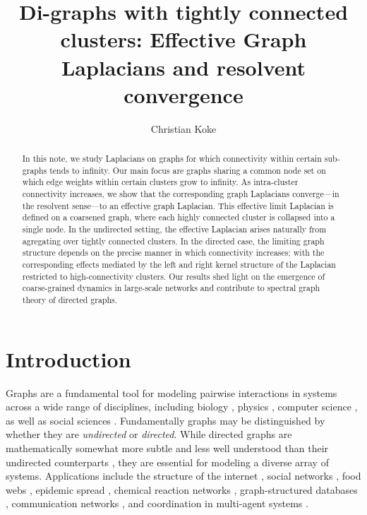 \documentclass[reqno,12pt,letterpaper]{amsart}
\title[Effective Graph Laplacians and resolvent convergence
]{Di-graphs with tightly connected clusters: Effective 
	Graph 
	Laplacians and resolvent convergence
}
\author{Christian Koke}
\numberwithin{equation}{section}
\newcommand{\1}{\mathds{1}}
\theoremstyle{definition}
\begin{document}
	
	\vspace*{-5mm}
	
	\maketitle
	
	\begin{abstract}
		In this note, we study Laplacians on graphs for which connectivity within certain sub-graphs tends to infinity. Our main focus 
		are graphs 	sharing
				a common node set on which
		  edge weights within certain clusters grow to infinity.
		As intra-cluster connectivity increases, we show that the corresponding graph Laplacians converge—in the resolvent sense—to an effective graph Laplacian. This effective limit Laplacian is defined on a coarsened graph, where each highly connected cluster is collapsed into a single node.
		In the undirected setting, the effective Laplacian arises naturally from agregating over tightly connected clusters.
		  In the directed case, the limiting graph structure depends on the precise manner in which connectivity increases; with the corresponding effects mediated by the left and right kernel structure of the Laplacian restricted to high-connectivity clusters.
		Our results shed light on the emergence of coarse-grained dynamics in large-scale networks and contribute to spectral graph theory of directed graphs.
	\end{abstract}
	
	\section{Introduction}\label{intro}
Graphs are a fundamental tool for modeling pairwise interactions in systems across a wide range of disciplines, including biology \cite{barabasi2000large}, physics \cite{watts1998collective}, computer science \cite{cormen2009introduction}, as well as social sciences \cite{wasserman1994social}.
Fundamentally graphs may be distinguished by whether they are \emph{undirected} or \emph{directed}.
While directed graphs are mathematically somewhat more subtle and less well understood than their undirected counterparts \cite{Veerman2017RandomWO,Veerman2020APO}, they are essential for modeling a diverse array of systems. Applications include the structure of the internet \cite{broder2000graph}, social networks \cite{carrington2005models}, food webs \cite{may1973qualitative}, epidemic spread \cite{jombert2011reconstructing}, chemical reaction networks \cite{rao2013graph}, graph-structured databases \cite{angles2008survey}, communication networks \cite{ahlswede2000network}, and coordination in multi-agent systems \cite{fax2004information}.
\end{document}
